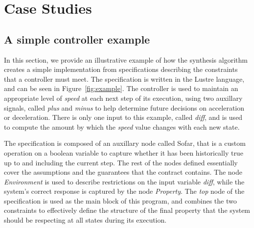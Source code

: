 \section{Case Studies}

\subsection{A simple controller example}

In this section, we provide an illustrative example of how the synthesis
algorithm creates a simple implementation from specifications describing the
constraints that a controller must meet. The specification is written in the
Lustre language, and can be seen in Figure~\ref{fig:example}. The controller
is used to maintain an appropriate level of \textit{speed} at each next step of
its execution, using two auxillary signals, called \textit{plus} and
\textit{minus} to help determine future decisions on acceleration or deceleration. There is
only one input to this example, called \textit{diff}, and is used to compute
the amount by which the \textit{speed} value changes with each new state.

The specification is composed of an auxillary node called Sofar, that is a
custom operation on a boolean variable to capture whether it has been
historically true up to and including the current step. The rest of the nodes
defined essentially cover the assumptions and the guarantees that the contract
contains. The node \textit{Environment} is used to describe restrictions on the
input variable \textit{diff}, while the system's correct response is captured by the
node \textit{Property}. The \textit{top} node of the specification is used as
the main block of this program, and combines the two constraints to effectively
define the structure of the final property that the system should be respecting
at all states during its execution.


